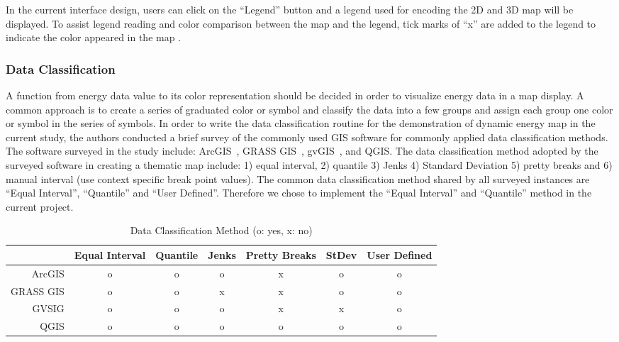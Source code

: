 In the current interface design, users can click on the ``Legend''
button and a legend used for encoding the 2D and 3D map will be
displayed. To assist legend reading and color comparison between the
map and the legend, tick marks of ``x'' are added to the legend to
indicate the color appeared in the map .

\subsubsection{Data Classification}\label{dataClassification}
A function from energy data value to its color representation should
be decided in order to visualize energy data in a map display. A
common approach is to create a series of graduated color or symbol and
classify the data into a few groups and assign each group one color or
symbol in the series of symbols. In order to write the data
classification routine for the demonstration of dynamic energy map in
the current study, the authors conducted a brief survey of the
commonly used GIS software for commonly applied data classification
methods. The software surveyed in the study include:
ArcGIS~\cite{GIS_Jenks2014}, GRASS GIS~\cite{GRASSGIS2008},
gvGIS~\cite{gvGIS2011}, and QGIS. The data classification method
adopted by the surveyed software in creating a thematic map include:
1) equal interval, 2) quantile 3) Jenks 4) Standard Deviation 5)
pretty breaks and 6) manual interval (use context specific break point
values). The common data classification method shared by all surveyed
instances are ``Equal Interval'', ``Quantile'' and ``User
Defined''. Therefore we chose to implement the ``Equal Interval'' and
``Quantile'' method in the current project.

\begin{table}[h!]
  \centering
  \begin{tabular}{r|c c c c c c}
    \hline
           & Equal Interval & Quantile & Jenks & Pretty Breaks & StDev & User Defined\\
    \hline
    ArcGIS &      o        &    o     &  o    & x &  o  &   o  \\
 GRASS GIS &      o        &    o     &  x    & x &  o  &   o  \\
     GVSIG &      o        &    o     &  o    & x &  x  &   o  \\
      QGIS &      o        &    o     &  o    & o &  o  &   o  \\
    \hline
  \end{tabular}
  \caption{Data Classification Method (o: yes, x: no)}
  \label{tab:classify}
\end{table}

